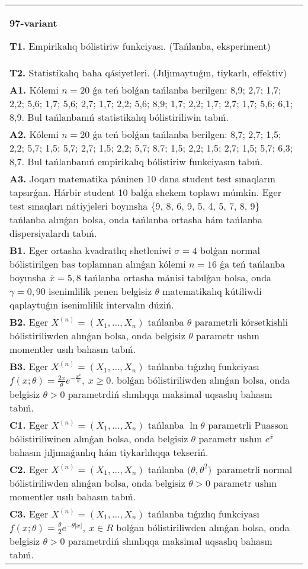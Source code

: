 \documentclass{article}
\begin{document}
\begin{tabular}{m{17cm}}
\textbf{97-variant}
\newline

\textbf{T1.} 
Empirikalıq bólistiriw funkciyası. (Tańlanba, eksperiment)
 \\
\textbf{T2.} 
Statistikalıq baha qásiyetleri. (Jıljımaytuǵın, tiykarlı, effektiv)
 \\
\textbf{A1.} 
Kólemi \(n = 20\) ǵa teń bolǵan tańlanba berilgen: 8,9; 2,7; 1,7; 2,2; 5,6; 1,7; 5,6; 2,7; 1,7; 2,2; 5,6; 8,9; 1,7; 2,2; 1,7; 2,7; 1,7; 5,6; 6,1; 8,9. Bul tańlanbanıń statistikalıq bólistiriliwin tabıń.
 \\
\textbf{A2.} 
Kólemi \(n = 20\) ǵa teń bolǵan tańlanba berilgen: 8,7; 2,7; 1,5; 2,2; 5,7; 1,5; 5,7; 2,7; 1,5; 2,2; 5,7; 8,7; 1,5; 2,2; 1,5; 2,7; 1,5; 5,7; 6,3; 8,7. Bul tańlanbanıń empirikalıq bólistiriw funkciyasın tabıń.
 \\
\textbf{A3.} 
Joqarı matematika páninen 10 dana student test sınaqların tapsırǵan. Hárbir student 10 balǵa shekem toplawı múmkin. Eger test sınaqları nátiyjeleri boyınsha \{9, 8, 6, 9, 5, 4, 5, 7, 8, 9\} tańlanba alınǵan bolsa, onda tańlanba ortasha hám tańlanba dispersiyalardı tabıń.
 \\
\textbf{B1.} 
Eger ortasha kvadratlıq shetleniwi \(\sigma = 4\) bolǵan normal bólistirilgen bas toplamnan alınǵan kólemi \(n = 16\) ǵa teń tańlanba boyınsha \(\overline{x} = 5,8\) tańlanba ortasha mánisi tabılǵan bolsa, onda \(\gamma = 0,90\) isenimlilik penen belgisiz \(\theta\) matematikalıq kútiliwdi qaplaytuǵın isenimlilik intervalın dúziń.
 \\
\textbf{B2.} 
Eger \(X^{(n)} = \left( X_{1},...,X_{n} \right)\) tańlanba \(\theta\) parametrli kórsetkishli bólistiriliwden alınǵan bolsa, onda belgisiz \(\theta\) parametr ushın momentler usılı bahasın tabıń.
 \\
\textbf{B3.} 
Eger \(X^{(n)} = \left( X_{1},...,X_{n} \right)\) tańlanba tıǵızlıq funkciyası \(f(x;\theta) = \frac{2x}{\theta}e^{- \frac{x^{2}}{\theta}},\ x \geq 0\). bolǵan bólistiriliwden alınǵan bolsa, onda belgisiz \(\theta > 0\) parametrdiń shınlıqqa maksimal uqsaslıq bahasın tabıń.
 \\
\textbf{C1.} 
Eger \(X^{(n)} = \left( X_{1},...,X_{n} \right)\) tańlanba \(\ln\theta\) parametrli Puasson bólistiriliwinen alınǵan bolsa, onda belgisiz \(\theta\) parametr ushın \(e^{\overline{x}}\) bahasın jıljımaǵanlıq hám tiykarlılıqqa tekseriń.
 \\
\textbf{C2.} 
Eger \(X^{(n)} = \left( X_{1},...,X_{n} \right)\) tańlanba \({(\theta,\theta}^{2})\ \) parametrli normal bólistiriliwden alınǵan bolsa, onda belgisiz \(\theta > 0\) parametr ushın momentler usılı bahasın tabıń.
 \\
\textbf{C3.} 
Eger \(X^{(n)} = \left( X_{1},...,X_{n} \right)\) tańlanba tıǵızlıq funkciyası
$f(x;\theta) = \frac{\theta}{2}e^{- \theta|x|},\ x \in R$
bolǵan bólistiriliwden alınǵan bolsa, onda belgisiz \(\theta > 0\) parametrdiń shınlıqqa maksimal uqsaslıq bahasın tabıń.
 \\

\end{tabular}
\vspace{1cm}
\end{document}
